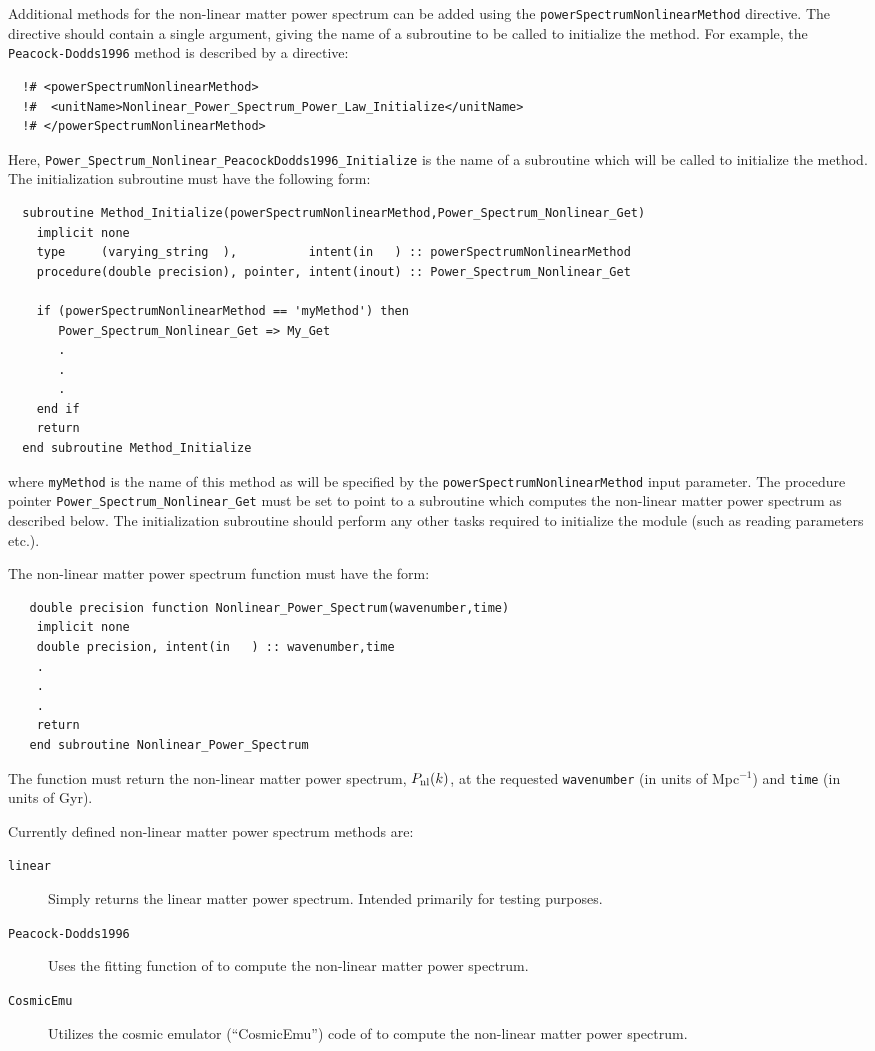 Additional methods for the non-linear matter power spectrum can be added using the {\tt powerSpectrumNonlinearMethod} directive. The directive should contain a single argument, giving the name of a subroutine to be called to initialize the method. For example, the {\tt Peacock-Dodds1996} method is described by a directive:
\begin{verbatim}
  !# <powerSpectrumNonlinearMethod>
  !#  <unitName>Nonlinear_Power_Spectrum_Power_Law_Initialize</unitName>
  !# </powerSpectrumNonlinearMethod>
\end{verbatim}
Here, {\tt Power\_Spectrum\_Nonlinear\_PeacockDodds1996\_Initialize} is the name of a subroutine which will be called to initialize the method. The initialization subroutine must have the following form:
\begin{verbatim}
  subroutine Method_Initialize(powerSpectrumNonlinearMethod,Power_Spectrum_Nonlinear_Get)
    implicit none
    type     (varying_string  ),          intent(in   ) :: powerSpectrumNonlinearMethod
    procedure(double precision), pointer, intent(inout) :: Power_Spectrum_Nonlinear_Get
    
    if (powerSpectrumNonlinearMethod == 'myMethod') then
       Power_Spectrum_Nonlinear_Get => My_Get
       .
       .
       .
    end if
    return
  end subroutine Method_Initialize
\end{verbatim}
where {\tt myMethod} is the name of this method as will be specified by the {\tt powerSpectrumNonlinearMethod} input parameter. The procedure pointer {\tt Power\_Spectrum\_Nonlinear\_Get} must be set to point to a subroutine which computes the non-linear matter power spectrum as described below. The initialization subroutine should perform any other tasks required to initialize the module (such as reading parameters etc.).

The non-linear matter power spectrum function must have the form:
\begin{verbatim}
   double precision function Nonlinear_Power_Spectrum(wavenumber,time)
    implicit none
    double precision, intent(in   ) :: wavenumber,time
    .
    .
    .
    return
   end subroutine Nonlinear_Power_Spectrum
\end{verbatim}
The function must return the non-linear matter power spectrum, $P_{\rm nl}(k)$, at the requested {\tt wavenumber} (in units of Mpc$^{-1}$) and {\tt time} (in units of Gyr).

Currently defined non-linear matter power spectrum methods are:
\begin{description}
 \item [{\tt linear}] Simply returns the linear matter power spectrum. Intended primarily for testing purposes.
 \item [{\tt Peacock-Dodds1996}] Uses the fitting function of \cite{peacock_non-linear_1996} to compute the non-linear matter power spectrum.
 \item [{\tt CosmicEmu}] Utilizes the cosmic emulator (``CosmicEmu'') code of \cite{lawrence_coyote_2010} to compute the non-linear matter power spectrum.
\end{description}

